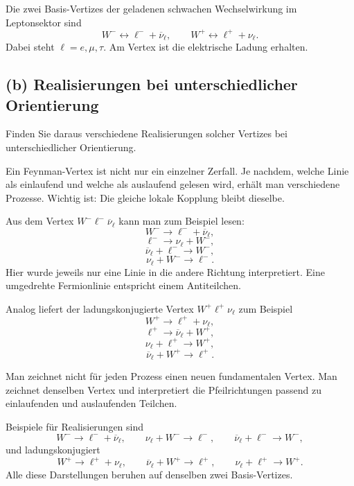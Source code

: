 \documentclass[11pt,a4paper]{scrartcl}
\begin{document}
\begin{answerbox}
Die zwei Basis-Vertizes der geladenen schwachen Wechselwirkung im Leptonsektor sind
\[
\boxed{W^- \leftrightarrow \ell^- + \overline{\nu}_\ell},
\qquad
\boxed{W^+ \leftrightarrow \ell^+ + \nu_\ell}.
\]
Dabei steht $\ell=e,\mu,\tau$. Am Vertex ist die elektrische Ladung erhalten.
\end{answerbox}

\subsection*{(b) Realisierungen bei unterschiedlicher Orientierung}

Finden Sie daraus verschiedene Realisierungen solcher Vertizes bei unterschiedlicher Orientierung.

\begin{calculationbox}
Ein Feynman-Vertex ist nicht nur ein einzelner Zerfall. Je nachdem, welche Linie als einlaufend und welche als auslaufend gelesen wird, erhält man verschiedene Prozesse. Wichtig ist: Die gleiche lokale Kopplung bleibt dieselbe.

\begin{calculationbox}
Aus dem Vertex $W^-\ell^-\overline{\nu}_\ell$ kann man zum Beispiel lesen:
\[
W^- \to \ell^- + \overline{\nu}_\ell,
\]
\[
\ell^- \to \nu_\ell + W^-,
\]
\[
\overline{\nu}_\ell + \ell^- \to W^-,
\]
\[
\nu_\ell + W^- \to \ell^-.
\]
Hier wurde jeweils nur eine Linie in die andere Richtung interpretiert. Eine umgedrehte Fermionlinie entspricht einem Antiteilchen.
\end{calculationbox}

\begin{calculationbox}
Analog liefert der ladungskonjugierte Vertex $W^+\ell^+\nu_\ell$ zum Beispiel
\[
W^+ \to \ell^+ + \nu_\ell,
\]
\[
\ell^+ \to \overline{\nu}_\ell + W^+,
\]
\[
\nu_\ell + \ell^+ \to W^+,
\]
\[
\overline{\nu}_\ell + W^+ \to \ell^+.
\]
\end{calculationbox}

Man zeichnet nicht für jeden Prozess einen neuen fundamentalen Vertex. Man zeichnet denselben Vertex und interpretiert die Pfeilrichtungen passend zu einlaufenden und auslaufenden Teilchen.
\end{calculationbox}

\begin{answerbox}
Beispiele für Realisierungen sind
\[
W^- \to \ell^-+\overline{\nu}_\ell,
\qquad
\nu_\ell+W^-\to \ell^-,
\qquad
\overline{\nu}_\ell+\ell^-\to W^-,
\]
und ladungskonjugiert
\[
W^+ \to \ell^+ + \nu_\ell,
\qquad
\overline{\nu}_\ell+W^+\to \ell^+,
\qquad
\nu_\ell+\ell^+\to W^+.
\]
Alle diese Darstellungen beruhen auf denselben zwei Basis-Vertizes.
\end{answerbox}
\end{document}
